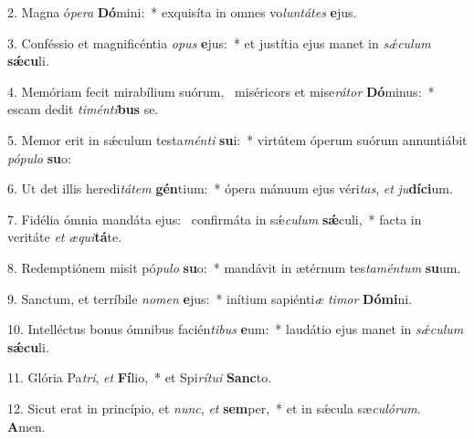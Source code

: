 2. Magna ó\textit{pe}\textit{ra} \textbf{Dó}mini:~*  exquisíta in omnes vo\textit{lun}\textit{tá}\textit{tes} \textbf{e}jus.\

3. Conféssio et magnificéntia \textit{o}\textit{pus} \textbf{e}jus:~*  et justítia ejus manet in \textit{sǽ}\textit{cu}\textit{lum} \textbf{sǽ}\textbf{cu}li.\

4. Memóriam fecit mirabílium suórum, \dag\  miséricors et mise\textit{rá}\textit{tor} \textbf{Dó}minus:~*  escam dedit \textit{ti}\textit{mén}\textit{ti}\textbf{bus} se.\

5. Memor erit in sǽculum testa\textit{mén}\textit{ti} \textbf{su}i:~*  virtútem óperum suórum annuntiábit \textit{pó}\textit{pu}\textit{lo} \textbf{su}o:\

6. Ut det illis heredi\textit{tá}\textit{tem} \textbf{gén}tium:~*  ópera mánuum ejus véri\textit{tas}, \textit{et} \textit{ju}\textbf{dí}\textbf{ci}um.\

7. Fidélia ómnia mandáta ejus: \dag\  confirmáta in sǽ\textit{cu}\textit{lum} \textbf{sǽ}culi,~*  facta in veritáte \textit{et} \textit{æ}\textit{qui}\textbf{tá}te.\

8. Redemptiónem misit pó\textit{pu}\textit{lo} \textbf{su}o:~*  mandávit in ætérnum tes\textit{ta}\textit{mén}\textit{tum} \textbf{su}um.\

9. Sanctum, et terríbile \textit{no}\textit{men} \textbf{e}jus:~*  inítium sapiénti\textit{æ} \textit{ti}\textit{mor} \textbf{Dó}\textbf{mi}ni.\

10. Intelléctus bonus ómnibus facién\textit{ti}\textit{bus} \textbf{e}um:~*  laudátio ejus manet in \textit{sǽ}\textit{cu}\textit{lum} \textbf{sǽ}\textbf{cu}li.\

11. Glória Pa\textit{tri}, \textit{et} \textbf{Fí}lio,~*  et Spi\textit{rí}\textit{tu}\textit{i} \textbf{Sanc}to.\

12. Sicut erat in princípio, et \textit{nunc}, \textit{et} \textbf{sem}per,~*  et in sǽcula sæ\textit{cu}\textit{ló}\textit{rum}. \textbf{A}men.\


